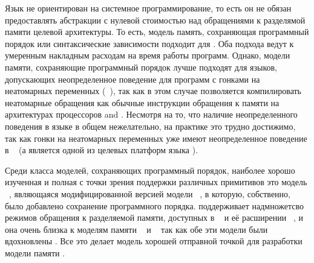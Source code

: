 Язык не ориентирован на системное программирование, 
то есть он не обязан предоставлять абстракции с нулевой стоимостью
над обращениями к разделямой памяти целевой архитектуры. 
То есть, модель память, сохраняющая программный порядок 
или синтаксические зависимости подходит для \Kotlin. 
Оба подхода ведут к умеренным накладным расходам 
на время работы программ. 
Однако, модели памяти, сохраняющие программный порядок
лучше подходят для языков, допускающих неопределенное поведение
для программ с гонками на неатомарных переменных
(\see~\cite{Ou-Demsky:OOPSLA18}), 
так как в этом случае позволяется компилировать неатомарные обращения
как обычные инструкции обращения к памяти на архитектурах 
процессоров \ARM and \POWER.
Несмотря на то, что наличие неопределенного поведения в языке 
\Kotlin в общем нежелательно, на практике это трудно достижимо, 
так как гонки на неатомарных переменных уже имеют 
неопределенное поведение в \LLVM~\cite{Chakraborty-Vafeiadis:CGO17}
(а \LLVM является одной из целевых платформ языка \Kotlin).

Среди класса моделей, сохраняющих программный порядок, наиболее 
хорошо изученная и полная с точки зрения поддержки 
различных примитивов это модель \RCMM~\cite{Lahav-al:PLDI17}, 
являющаяся модифицированной версией модели \CMM~\cite{Batty-al:POPL11}, 
в которую, собственно, было добавлено сохранение программного порядка.
\RCMM поддерживает надмножетсво режимов обращения к разделяемой памяти, 
доступных в \JMM~\cite{Manson-al:POPL05} и её расширении \JAM~\cite{Bender-Palsberg:OOPSLA19}, 
и она очень близка к моделям памяти 
\JS~\cite{Watt-al:PLDI2020} и \LLVM~\cite{Chakraborty-Vafeiadis:CGO17} 
так как обе эти модели были вдохновлены \CMM.
Все это делает модель \RCMM хорошей отправной точкой для разработки модели памяти \Kotlin.

